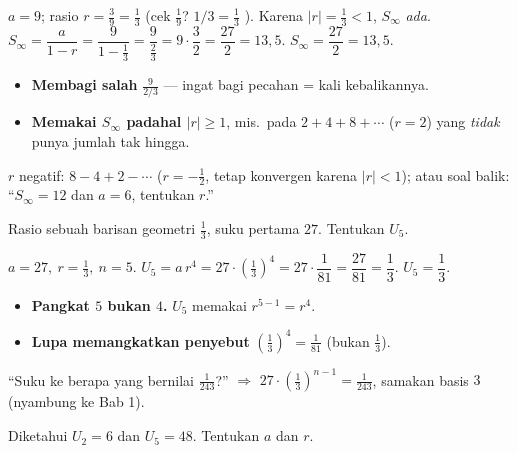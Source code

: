 \jawab
{} $a=9$; rasio $r=\frac{3}{9}=\frac13$ (cek $\frac19$? $1/3=\frac13$
\checkmark). Karena $|r|=\frac13<1$, $S_\infty$ \emph{ada}.
 $S_\infty=\dfrac{a}{1-r}=\dfrac{9}{1-\frac13}=\dfrac{9}{\frac23}
=9\cdot\dfrac32=\dfrac{27}{2}=13{,}5$.
\jadi $S_\infty=\dfrac{27}{2}=13{,}5$.

\begin{jebakan}
\begin{itemize}[leftmargin=*,topsep=2pt]
  \item \textbf{Membagi salah} $\frac{9}{2/3}$ --- ingat bagi pecahan = kali
  kebalikannya.
  \item \textbf{Memakai $S_\infty$ padahal $|r|\ge1$}, mis.\ pada $2+4+8+\cdots$
  ($r=2$) yang \emph{tidak} punya jumlah tak hingga.
\end{itemize}
\end{jebakan}

\begin{variasi}
$r$ negatif: $8-4+2-\cdots$ ($r=-\frac12$, tetap konvergen karena
$|r|<1$); atau soal balik: ``$S_\infty=12$ dan $a=6$, tentukan $r$.''
\end{variasi}

\begin{soalbox}{}
Rasio sebuah barisan geometri $\tfrac13$, suku pertama $27$. Tentukan $U_5$.
\end{soalbox}

\jawab
{} $a=27,\ r=\frac13,\ n=5$.
 $U_5=a\,r^{4}=27\cdot\left(\tfrac13\right)^4=27\cdot\dfrac{1}{81}
=\dfrac{27}{81}=\dfrac13$.
\jadi $U_5=\dfrac13$.

\begin{jebakan}
\begin{itemize}[leftmargin=*,topsep=2pt]
  \item \textbf{Pangkat $5$ bukan $4$.} $U_5$ memakai $r^{5-1}=r^4$.
  \item \textbf{Lupa memangkatkan penyebut} $\left(\frac13\right)^4=\frac{1}{81}$
  (bukan $\frac13$).
\end{itemize}
\end{jebakan}

\begin{variasi}
``Suku ke berapa yang bernilai $\frac{1}{243}$?'' $\Rightarrow$
$27\cdot(\frac13)^{n-1}=\frac{1}{243}$, samakan basis $3$ (nyambung ke Bab 1).
\end{variasi}

\begin{soalbox}{}
Diketahui $U_2=6$ dan $U_5=48$. Tentukan $a$ dan $r$.
\end{soalbox}

